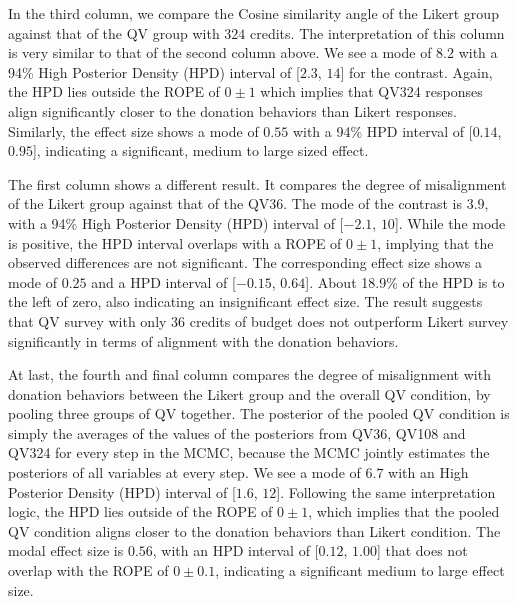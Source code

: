 In the third column, we compare the Cosine similarity angle of the Likert group
against that of the QV group with $324$ credits. The interpretation of this column is very similar to that of the second column above. We see a mode of $8.2$
with a 94\% High Posterior Density (HPD) interval of [$2.3$, $14$] for the contrast.
Again, the HPD lies outside the ROPE of $0 \pm 1$
which implies that QV324 responses align significantly closer to the donation behaviors than Likert responses. Similarly, the effect size shows a mode of $0.55$ with a 94\% HPD interval of [$0.14$, $0.95$], indicating a significant, medium to large sized effect.

The first column shows a different result. It compares the degree of misalignment of the Likert group against that of the QV36. The mode of the contrast is $3.9$, with a 94\% High Posterior Density (HPD) interval of [$-2.1$, $10$]. While the mode is positive, the HPD interval overlaps with a ROPE of $0 \pm 1$, implying that the observed differences are not significant. The corresponding effect size shows a mode of $0.25$ and a HPD interval of [$-0.15$, $0.64$]. About 18.9\% of the HPD is to the left of zero, also indicating an insignificant effect size. The result suggests that QV survey with only 36 credits of budget does not outperform Likert survey significantly in terms of alignment with the donation behaviors.

At last, the fourth and final column compares the degree of misalignment with donation behaviors between the Likert group and the overall QV condition, by pooling three groups of QV together. The posterior of the pooled QV condition is simply the averages of the values of the posteriors from QV36, QV108 and QV324 for every step in the MCMC, because the MCMC jointly estimates the posteriors of all variables at every step. We see a mode of $6.7$ with an High Posterior Density (HPD) interval of [$1.6$, $12$]. Following the same interpretation logic, the HPD lies outside of the ROPE of $0 \pm 1$, which implies that the pooled QV condition aligns closer to the donation behaviors than Likert condition. The modal effect size is $0.56$, with an HPD interval of [$0.12$, $1.00$] that does not overlap with the ROPE of $0 \pm 0.1$, indicating a significant medium to large effect size.



